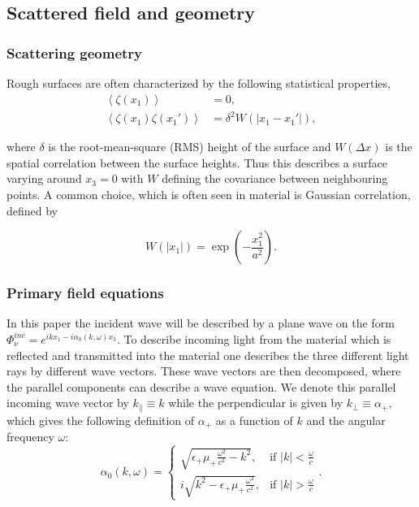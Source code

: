 \documentclass[../main.tex]{subfiles}
\begin{document}

\subsection{Scattered field and geometry}

\subsubsection{Scattering geometry}

Rough surfaces are often characterized by the following statistical properties,
\begin{subequations}
\begin{align}
    \left\langle \zeta(x_1)\right\rangle &= 0, \\
    \left\langle \zeta(x_1)\zeta(x_1')\right\rangle &= \delta^2 W(|x_1 - x_1'|),
\end{align}
\end{subequations}

where $\delta$ is the root-mean-square (RMS) height of the surface and $W(\Delta x)$ is the spatial correlation between the surface heights. Thus this describes a surface varying around $x_3=0$ with $W$ defining the covariance between neighbouring points. A common choice, which is often seen in material is Gaussian correlation, defined by

\begin{equation} \label{eq:gauss_corr}
    W(|x_1|) = \exp\left(-\frac{x_1^2}{a^2}\right).
\end{equation}

\subsubsection{Primary field equations}
In this paper the incident wave will be described by a plane wave on the form $\Phi^{inc}_\nu = e^{ikx_1-i\alpha_0(k,\omega)x_3}$. To describe incoming light from the material  which is reflected and transmitted into the material one describes the three different light rays by different wave vectors. These wave vectors are then decomposed, where the parallel components can describe a wave equation. We denote this parallel incoming wave vector by $k_\parallel \equiv k$ while the perpendicular is given by $k_\perp \equiv \alpha_+$, which gives the following definition of $\alpha_+$ as a function of $k$ and the angular frequency $\omega$:
\begin{equation}
    \alpha_0(k, \omega) = 
    \begin{cases} \sqrt{\epsilon_+ \mu_+ \frac{\omega^2}{c^2} - k^2}, & \mbox{if } |k|<\frac{\omega}{c} \\ 
    i\sqrt{k^2 - \epsilon_+ \mu_+ \frac{\omega^2}{c^2}}, & \mbox{if } |k| > \frac{\omega}{c}\end{cases}.
\label{alpha_plus}
\end{equation}
\end{document}
